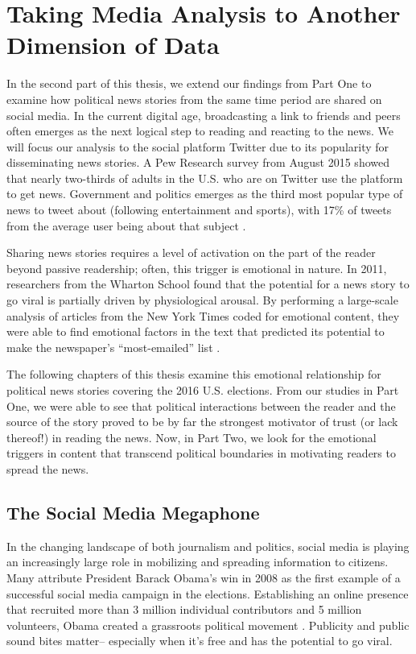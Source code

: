 \chapter{Taking Media Analysis to Another Dimension of Data}
In the second part of this thesis, we extend our findings from Part One to examine how political news stories from the same time period are shared on social media. In the current digital age, broadcasting a link to friends and peers often emerges as the next logical step to reading and reacting to the news. We will focus our analysis to the social platform Twitter due to its popularity for disseminating news stories. A Pew Research survey from August 2015 showed that nearly two-thirds of adults in the U.S. who are on Twitter use the platform to get news.  Government and politics emerges as the third most popular type of news to tweet about (following entertainment and sports), with 17\% of tweets from the average user being about that subject \cite{pew-twitter-news}.

Sharing news stories requires a level of activation on the part of the reader beyond passive readership; often, this trigger is emotional in nature. In 2011, researchers from the Wharton School found that the potential for a news story to go viral is partially driven by physiological arousal. By performing a large-scale analysis of articles from the New York Times coded for emotional content, they were able to find emotional factors in the text that predicted its potential to make the newspaper’s “most-emailed” list \cite{berger2012makes}.

The following chapters of this thesis examine this emotional relationship for political news stories covering the 2016 U.S. elections. From our studies in Part One, we were able to see that political interactions between the reader and the source of the story proved to be by far the strongest motivator of trust (or lack thereof!) in reading the news. Now, in Part Two, we look for the emotional triggers in content that transcend political boundaries in motivating readers to spread the news.


\section{The Social Media Megaphone}
In the changing landscape of both journalism and politics, social media is playing an increasingly large role in mobilizing and spreading information to citizens. Many attribute President Barack Obama’s win in 2008 as the first example of a successful social media campaign in the elections. Establishing an online presence that recruited more than 3 million individual contributors and 5 million volunteers, Obama created a grassroots political movement \cite{cogburn2011networked}. Publicity and public sound bites matter-- especially when it’s free and has the potential to go viral.


